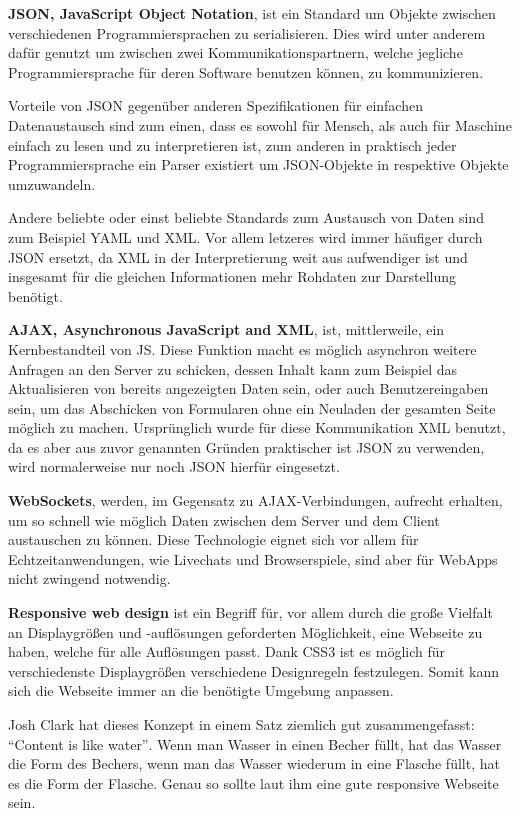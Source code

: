 \documentclass[a4paper,12pt,ngerman,listof=numbered]{scrartcl}      %
\let\oldcite\cite
\renewcommand{\cite}[1]{\textsuperscript{\oldcite{#1}}}
\newcommand{\spacer}{\par\bigskip\noindent}
\begin{document}
	\spacer\textbf{JSON, JavaScript Object Notation}, ist ein Standard um Objekte zwischen verschiedenen Programmiersprachen zu serialisieren. Dies wird unter anderem dafür genutzt um zwischen zwei Kommunikationspartnern, welche jegliche Programmiersprache für deren Software benutzen können, zu kommunizieren.\par
	Vorteile von JSON gegenüber anderen Spezifikationen für einfachen Datenaustausch sind zum einen, dass es sowohl für Mensch, als auch für Maschine einfach zu lesen und zu interpretieren ist, zum anderen in praktisch jeder Programmiersprache ein Parser existiert um JSON-Objekte in respektive Objekte umzuwandeln.\cite{json}\par
	Andere beliebte oder einst beliebte Standards zum Austausch von Daten sind zum Beispiel YAML und XML. Vor allem letzeres wird immer häufiger durch JSON ersetzt, da XML in der Interpretierung weit aus aufwendiger ist und insgesamt für die gleichen Informationen mehr Rohdaten zur Darstellung benötigt.\par
	
	\spacer\textbf{AJAX, Asynchronous JavaScript and XML}, ist, mittlerweile, ein Kernbestandteil von JS. Diese Funktion macht es möglich asynchron weitere Anfragen an den Server zu schicken, dessen Inhalt kann zum Beispiel das Aktualisieren von bereits angezeigten Daten sein, oder auch Benutzereingaben sein, um das Abschicken von Formularen ohne ein Neuladen der gesamten Seite möglich zu machen. Ursprünglich wurde für diese Kommunikation XML benutzt, da es aber aus zuvor genannten Gründen praktischer ist JSON zu verwenden, wird normalerweise nur noch JSON hierfür eingesetzt.\cite{ajaxWiki}\par
	
	\spacer\textbf{WebSockets}, werden, im Gegensatz zu AJAX-Verbindungen, aufrecht erhalten, um so schnell wie möglich Daten zwischen dem Server und dem Client austauschen zu können. Diese Technologie eignet sich vor allem für Echtzeitanwendungen, wie Livechats und Browserspiele, sind aber für WebApps nicht zwingend notwendig.\cite{websocketWiki}\par
	
	\spacer\textbf{Responsive web design} ist ein Begriff für, vor allem durch die große Vielfalt an Displaygrößen und -auflösungen geforderten Möglichkeit, eine Webseite zu haben, welche für alle Auflösungen passt. Dank CSS3 ist es möglich für verschiedenste Displaygrößen verschiedene Designregeln festzulegen. Somit kann sich die Webseite immer an die benötigte Umgebung anpassen.\par
	Josh Clark hat dieses Konzept in einem Satz ziemlich gut zusammengefasst: ``Content is like water''\cite{wikiResponsive}. Wenn man Wasser in einen Becher füllt, hat das Wasser die Form des Bechers, wenn man das Wasser wiederum in eine Flasche füllt, hat es die Form der Flasche. Genau so sollte laut ihm eine gute responsive Webseite sein.\par
	
\end{document}
